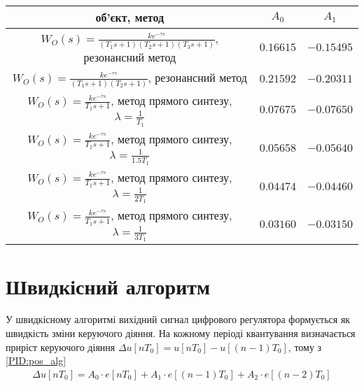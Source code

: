 \begin{center}
    \begin{tabular}{|c|c|c|}
        \hline
        об'єкт, метод & $A_0$ & $A_1$ \\
        \hline
        $W_O(s) = \frac{ k e^{-\tau s}}{(T_1 s + 1) (T_2 s + 1) (T_3 s + 1)}$, резонансний метод 
        & $0.16615$ & $-0.15495$ \\ \hline
        $W_O(s) = \frac{ k e^{-\tau s}}{(T_1 s + 1) (T_2 s + 1)}$, резонансний метод 
        & $0.21592$ & $-0.20311$ \\ \hline
        $W_O(s) = \frac{ k e^{-\tau s}}{T_1 s + 1}$, метод прямого синтезу, $\lambda = \frac{1}{T_1}$ 
        & $0.07675$ & $-0.07650$ \\ \hline
        $W_O(s) = \frac{ k e^{-\tau s}}{T_1 s + 1}$, метод прямого синтезу, $\lambda = \frac{1}{1.5T_1}$ 
        & $0.05658$ & $-0.05640$ \\ \hline
        $W_O(s) = \frac{ k e^{-\tau s}}{T_1 s + 1}$, метод прямого синтезу, $\lambda = \frac{1}{2T_1}$ 
        & $0.04474$ & $-0.04460$ \\ \hline
        $W_O(s) = \frac{ k e^{-\tau s}}{T_1 s + 1}$, метод прямого синтезу, $\lambda = \frac{1}{3T_1}$ 
        & $0.03160$ & $-0.03150$ \\ \hline
    \end{tabular}
\end{center}

\section{Швидкісний алгоритм}
У швидкісному алгоритмі вихідний сигнал цифрового регулятора формується як швидкість зміни керуючого діяння.
На кожному періоді квантування визначається приріст керуючого діяння
$\Delta u\left[n T_0\right] = u\left[n T_0\right] - u\left[(n-1) T_0\right]$,
тому з \eqref{PID:pos_alg}
\begin{gather}
    \Delta u\left[n T_0\right] = 
    A_0 \cdot e\left[n T_0\right] + A_1 \cdot e\left[(n-1) T_0\right] + A_2 \cdot e\left[(n-2) T_0\right]
\end{gather}